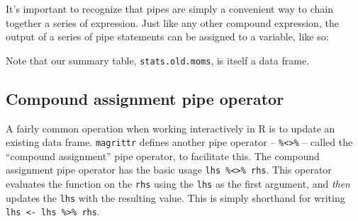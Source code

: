 \documentclass[]{book}
\newenvironment{Shaded}{\begin{snugshade}}{\end{snugshade}}
\newcommand{\CommentTok}[1]{\textcolor[rgb]{0.56,0.35,0.01}{\textit{#1}}}
\newcommand{\DataTypeTok}[1]{\textcolor[rgb]{0.13,0.29,0.53}{#1}}
\newcommand{\DecValTok}[1]{\textcolor[rgb]{0.00,0.00,0.81}{#1}}
\newcommand{\FloatTok}[1]{\textcolor[rgb]{0.00,0.00,0.81}{#1}}
\newcommand{\KeywordTok}[1]{\textcolor[rgb]{0.13,0.29,0.53}{\textbf{#1}}}
\newcommand{\NormalTok}[1]{#1}
\newcommand{\OperatorTok}[1]{\textcolor[rgb]{0.81,0.36,0.00}{\textbf{#1}}}
\newcommand{\StringTok}[1]{\textcolor[rgb]{0.31,0.60,0.02}{#1}}
\theoremstyle{definition}
\theoremstyle{definition}
\theoremstyle{definition}
\theoremstyle{remark}
\begin{document}
It's important to recognize that pipes are simply a convenient way to
chain together a series of expression. Just like any other compound
expression, the output of a series of pipe statements can be assigned to
a variable, like so:

\begin{Shaded}
\end{Shaded}

Note that our summary table, \texttt{stats.old.moms}, is itself a data
frame.

\hypertarget{compound-assignment-pipe-operator}{%
\subsection{Compound assignment pipe
operator}\label{compound-assignment-pipe-operator}}

A fairly common operation when working interactively in R is to update
an existing data frame. \texttt{magrittr} defines another pipe operator
-- \texttt{\%\textless{}\textgreater{}\%} -- called the ``compound
assignment'' pipe operator, to facilitate this. The compound assignment
pipe operator has the basic usage
\texttt{lhs\ \%\textless{}\textgreater{}\%\ rhs}. This operator
evaluates the function on the \texttt{rhs} using the \texttt{lhs} as the
first argument, and \emph{then} updates the \texttt{lhs} with the
resulting value. This is simply shorthand for writing
\texttt{lhs\ \textless{}-\ lhs\ \%\textgreater{}\%\ rhs}.

\begin{Shaded}
\end{Shaded}
\end{document}
